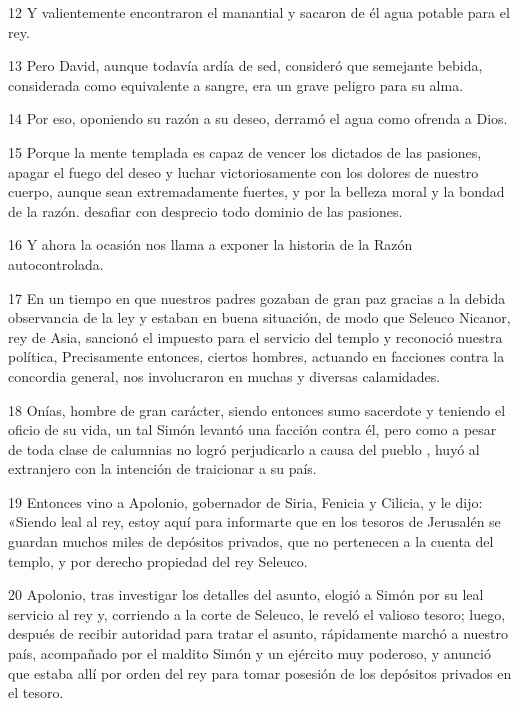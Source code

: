 \par 12 Y valientemente encontraron el manantial y sacaron de él agua potable para el rey.

\par 13 Pero David, aunque todavía ardía de sed, consideró que semejante bebida, considerada como equivalente a sangre, era un grave peligro para su alma.

\par 14 Por eso, oponiendo su razón a su deseo, derramó el agua como ofrenda a Dios.

\par 15 Porque la mente templada es capaz de vencer los dictados de las pasiones, apagar el fuego del deseo y luchar victoriosamente con los dolores de nuestro cuerpo, aunque sean extremadamente fuertes, y por la belleza moral y la bondad de la razón. desafiar con desprecio todo dominio de las pasiones.

\par 16 Y ahora la ocasión nos llama a exponer la historia de la Razón autocontrolada.

\par 17 En un tiempo en que nuestros padres gozaban de gran paz gracias a la debida observancia de la ley y estaban en buena situación, de modo que Seleuco Nicanor, rey de Asia, sancionó el impuesto para el servicio del templo y reconoció nuestra política, Precisamente entonces, ciertos hombres, actuando en facciones contra la concordia general, nos involucraron en muchas y diversas calamidades.

\par 18 Onías, hombre de gran carácter, siendo entonces sumo sacerdote y teniendo el oficio de su vida, un tal Simón levantó una facción contra él, pero como a pesar de toda clase de calumnias no logró perjudicarlo a causa del pueblo , huyó al extranjero con la intención de traicionar a su país.

\par 19 Entonces vino a Apolonio, gobernador de Siria, Fenicia y Cilicia, y le dijo: «Siendo leal al rey, estoy aquí para informarte que en los tesoros de Jerusalén se guardan muchos miles de depósitos privados, que no pertenecen a la cuenta del templo, y por derecho propiedad del rey Seleuco.

\par 20 Apolonio, tras investigar los detalles del asunto, elogió a Simón por su leal servicio al rey y, corriendo a la corte de Seleuco, le reveló el valioso tesoro; luego, después de recibir autoridad para tratar el asunto, rápidamente marchó a nuestro país, acompañado por el maldito Simón y un ejército muy poderoso, y anunció que estaba allí por orden del rey para tomar posesión de los depósitos privados en el tesoro.

